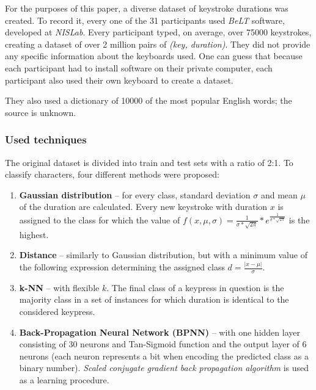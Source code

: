 \documentclass[../main.tex]{subfiles}
\begin{document}
For the purposes of this paper, a diverse dataset of keystroke durations was created. To record it, every one of the 31 participants used \textit{BeLT} software, developed at \textit{NISLab}. Every participant typed, on average, over 75000 keystrokes, creating a dataset of over 2 million pairs of \textit{(key, duration)}. They did not provide any specific information about the keyboards used. One can guess that because each participant had to install software on their private computer, each participant also used their own keyboard to create a dataset.


They also used a dictionary of 10000 of the most popular English words; the source is unknown. 
\subsubsection{Used techniques}
The original dataset is divided into train and test sets with a ratio of 2:1. To classify characters, four different methods were proposed:
\begin{enumerate}
    \item \textbf{Gaussian distribution} -- for every class, standard deviation $\sigma$ and mean $\mu$ of the duration are calculated. Every new keystroke with duration $x$ is assigned to the class for which the value of $f(x, \mu, \sigma) = \frac{1}{\sigma *\sqrt{2\pi}} * e ^{\frac{1}{\sigma *\sqrt{2\pi}}}$ is the highest.
    \item \textbf{Distance} -- similarly to Gaussian distribution, but with a minimum value of the following expression determining the assigned class $d = \frac{|x - \mu|}{\sigma}$.
    \item \textbf{k-NN} -- with flexible $k$. The final class of a keypress in question is the majority class in a set of instances for which duration is identical to the considered keypress.
    \item \textbf{Back-Propagation Neural Network (BPNN)} -- with one hidden layer consisting of 30 neurons and Tan-Sigmoid function and the output layer of 6 neurons (each neuron represents a bit when encoding the predicted class as a binary number). \textit{Scaled conjugate gradient back propagation algorithm} is used as a learning procedure.
\end{enumerate}
\end{document}

